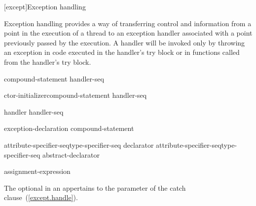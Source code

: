 [except]{Exception handling}%


%

\pnum
Exception handling provides a way of transferring control and information
from a point in the execution of a thread to an exception handler
associated with a point previously passed by the execution.
A handler will be invoked only by throwing an exception
in code executed in the handler's try block
or in functions called from the handler's try block.

%
%
\begin{bnf}
\br
     compound-statement handler-seq
\end{bnf}

%
%
\begin{bnf}
\br
     ctor-initializer\opt compound-statement handler-seq
\end{bnf}

\begin{bnf}
\br
    handler handler-seq\opt
\end{bnf}

%
%
\begin{bnf}
\br
     exception-declaration \terminal{)} compound-statement
\end{bnf}

\begin{bnf}
\br
    attribute-specifier-seq\opt type-specifier-seq declarator\br
    attribute-specifier-seq\opt type-specifier-seq abstract-declarator\opt\br
\end{bnf}

%
%
\begin{bnf}
\br
      assignment-expression\opt
\end{bnf}

The optional  in an 
appertains to the parameter of the catch clause~(\ref{except.handle}).

